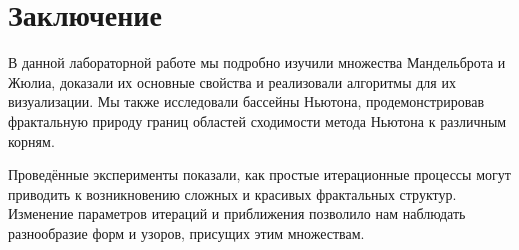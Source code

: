 \documentclass{article}
\begin{document}
	\section{Заключение}
	В данной лабораторной работе мы подробно изучили множества Мандельброта и Жюлиа, доказали их основные свойства и реализовали алгоритмы для их визуализации. Мы также исследовали бассейны Ньютона, продемонстрировав фрактальную природу границ областей сходимости метода Ньютона к различным корням.
	
	Проведённые эксперименты показали, как простые итерационные процессы могут приводить к возникновению сложных и красивых фрактальных структур. Изменение параметров итераций и приближения позволило нам наблюдать разнообразие форм и узоров, присущих этим множествам.

	
\end{document}
